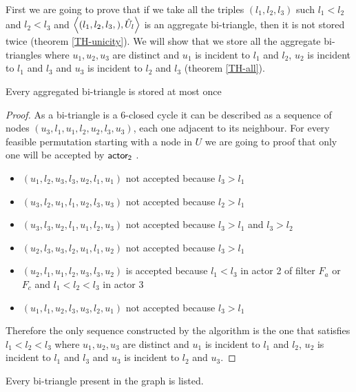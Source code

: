 First we are going to prove that if we take all the triples $(l_1,l_2,l_3)$  such $l_1<l_2$ and $l_2<l_3$  and  $\left\langle (l_1,l_2,l_3,), \hat{U}_l \right\rangle$ is an aggregate  bi-triangle, then it is not stored twice (theorem \ref{TH-unicity}). 
We will show that we store all the aggregate bi-triangles where $u_1,u_2,u_3$  are distinct and $u_1$ is incident to $l_1$ and $l_2$, $u_2$ is incident to $l_1$ and $l_3$ and $u_3$ is incident to $l_2$ and $l_3$ (theorem \ref{TH-all}). 
\begin{theorem} \label{TH-unicity}Every aggregated bi-triangle is stored  at most once 

\end{theorem}
\begin{proof}
As a bi-triangle is a 6-closed cycle it can be described as a sequence of nodes  $(u_3,l_1,u_1,l_2,u_2,l_3,u_3)$, each one adjacent to its neighbour. For every feasible permutation  starting with a node in $U$ we are going to proof that only one will be accepted by $\mathsf{actor_2}$ .  
\begin{itemize}
    \item $(u_1,l_2,u_3,l_3,u_2,l_1,u_1)$ not accepted because $l_3 > l_1$
    \item $(u_3,l_2,u_1,l_1,u_2,l_3,u_3)$ not accepted because $l_2 > l_1$
    \item $(u_3,l_3,u_2,l_1,u_1,l_2,u_3)$ not accepted because $l_3 > l_1$ and $l_3 > l_2$
    \item $(u_2,l_3,u_3,l_2,u_1,l_1,u_2)$ not accepted because $l_3 > l_1 $
    \item $(u_2,l_1,u_1,l_2,u_3,l_3,u_2)$ is accepted because $l_1 < l_3 $ in actor 2 of filter $F_a$ or $F_c$ and $l_1 < l_2 <l_3$  in actor 3
    \item $(u_1, l_1,u_2,l_3,u_3,l_2,u_1)$ not accepted because $l_3 > l_1$
\end{itemize}


Therefore the  only sequence constructed by the algorithm is the one that satisfies $l_1 < l_2 < l_3$ where $u_1,u_2,u_3$  are distinct and $u_1$ is incident to $l_1$ and $l_2$, $u_2$ is incident to $l_1$ and $l_3$ and $u_3$ is incident to $l_2$ and $u_3$.
\end{proof}


\begin{theorem}\label{TH-all}Every bi-triangle present in the graph is listed.

\end{theorem}

